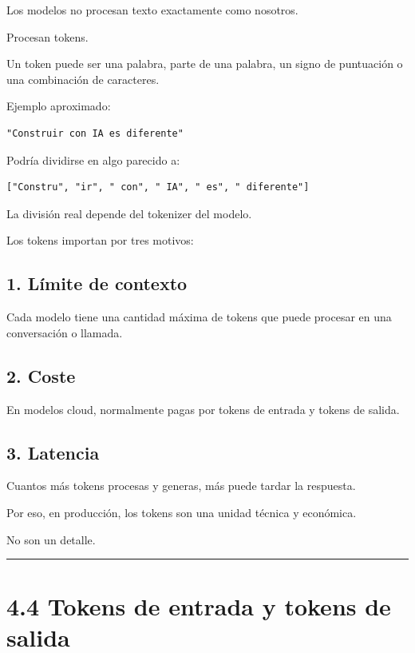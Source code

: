 Los modelos no procesan texto exactamente como nosotros.

Procesan tokens.

Un token puede ser una palabra, parte de una palabra, un signo de
puntuación o una combinación de caracteres.

Ejemplo aproximado:

\begin{lstlisting}
"Construir con IA es diferente"
\end{lstlisting}

Podría dividirse en algo parecido a:

\begin{lstlisting}
["Constru", "ir", " con", " IA", " es", " diferente"]
\end{lstlisting}

La división real depende del tokenizer del modelo.

Los tokens importan por tres motivos:

\subsection{1. Límite de contexto}\label{luxedmite-de-contexto}

Cada modelo tiene una cantidad máxima de tokens que puede procesar en
una conversación o llamada.

\subsection{2. Coste}\label{coste-1}

En modelos cloud, normalmente pagas por tokens de entrada y tokens de
salida.

\subsection{3. Latencia}\label{latencia-1}

Cuantos más tokens procesas y generas, más puede tardar la respuesta.

Por eso, en producción, los tokens son una unidad técnica y económica.

No son un detalle.

\begin{center}\rule{0.5\linewidth}{0.5pt}\end{center}

\section{4.4 Tokens de entrada y tokens de
salida}\label{tokens-de-entrada-y-tokens-de-salida}

